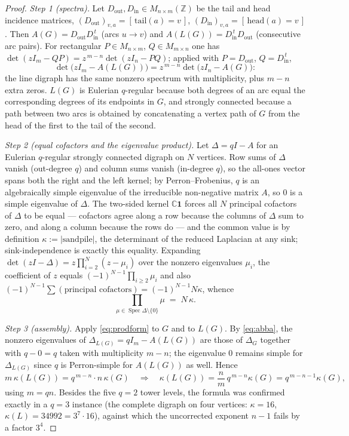 \documentclass[11pt]{amsart}
\numberwithin{equation}{section}
\theoremstyle{definition}
\theoremstyle{remark}
\newcommand{\Z}{\mathbb{Z}}
\newcommand{\C}{\mathbb{C}}
\begin{document}
\begin{proof}
\emph{Step 1 (spectra).} Let $D_{\mathrm{out}},D_{\mathrm{in}}\in M_{n\times m}(\Z)$
be the tail and head incidence matrices, $(D_{\mathrm{out}})_{v,a}=[\,\mathrm{tail}(a)
=v\,]$, $(D_{\mathrm{in}})_{v,a}=[\,\mathrm{head}(a)=v\,]$. Then
$A(G)=D_{\mathrm{out}}D_{\mathrm{in}}^{\,t}$ (arcs $u\to v$) and
$A(L(G))=D_{\mathrm{in}}^{\,t}D_{\mathrm{out}}$ (consecutive arc pairs). For
rectangular $P\in M_{n\times m}$, $Q\in M_{m\times n}$ one has
$\det(zI_m-QP)=z^{\,m-n}\det(zI_n-PQ)$; applied with $P=D_{\mathrm{out}}$,
$Q=D_{\mathrm{in}}^{\,t}$,
\begin{equation}\label{eq:abba}
\det\bigl(zI_m-A(L(G))\bigr)=z^{\,m-n}\det\bigl(zI_n-A(G)\bigr):
\end{equation}
the line digraph has the same nonzero spectrum with multiplicity, plus $m-n$ extra
zeros. $L(G)$ is Eulerian $q$-regular because both degrees of an arc equal the
corresponding degrees of its endpoints in $G$, and strongly connected because a path
between two arcs is obtained by concatenating a vertex path of $G$ from the head of
the first to the tail of the second.

\emph{Step 2 (equal cofactors and the eigenvalue product).} Let
$\Delta=qI-A$ for an Eulerian $q$-regular strongly connected digraph on $N$ vertices.
Row sums of $\Delta$ vanish (out-degree $q$) and column sums vanish (in-degree $q$),
so the all-ones vector spans both the right and the left kernel; by Perron--Frobenius,
$q$ is an algebraically simple eigenvalue of the irreducible non-negative matrix $A$,
so $0$ is a simple eigenvalue of $\Delta$. The two-sided kernel $\C\mathbf1$ forces
all $N$ principal cofactors of $\Delta$ to be equal --- cofactors agree along a row
because the columns of $\Delta$ sum to zero, and along a column because the rows do
--- and the common value is by definition $\kappa:=|\mathrm{sandpile}|$, the
determinant of the reduced Laplacian at any sink; sink-independence is exactly this
equality. Expanding $\det(zI-\Delta)=z\prod_{i=2}^{N}(z-\mu_i)$ over the nonzero
eigenvalues $\mu_i$, the coefficient of $z$ equals $(-1)^{N-1}\prod_{i\ge2}\mu_i$ and
also $(-1)^{N-1}\sum(\text{principal cofactors})=(-1)^{N-1}N\kappa$, whence
\begin{equation}\label{eq:prodform}
\prod_{\mu\in\operatorname{Spec}\Delta\setminus\{0\}}\mu\;=\;N\,\kappa .
\end{equation}

\emph{Step 3 (assembly).} Apply \eqref{eq:prodform} to $G$ and to $L(G)$. By
\eqref{eq:abba}, the nonzero eigenvalues of $\Delta_{L(G)}=qI_m-A(L(G))$ are those of
$\Delta_G$ together with $q-0=q$ taken with multiplicity $m-n$; the eigenvalue $0$
remains simple for $\Delta_{L(G)}$ since $q$ is Perron-simple for $A(L(G))$ as well.
Hence
\[
m\,\kappa(L(G))=q^{\,m-n}\cdot n\,\kappa(G)
\quad\Longrightarrow\quad
\kappa(L(G))=\frac{n}{m}\,q^{\,m-n}\kappa(G)=q^{\,m-n-1}\kappa(G),
\]
using $m=qn$. Besides the five $q=2$ tower levels, the formula was confirmed exactly
in a $q=3$ instance (the complete digraph on four vertices: $\kappa=16$,
$\kappa(L)=34992=3^{7}\cdot16$), against which the uncorrected exponent $n-1$ fails by
a factor $3^{4}$.
\end{proof}
\end{document}
